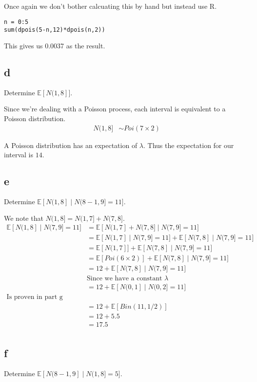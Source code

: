\documentclass{article}
\newcommand{\expect}{\mathbb{E}}
\begin{document}
Once again we don't bother calcuating this by hand but instead use R.
\begin{verbatim}
n = 0:5
sum(dpois(5-n,12)*dpois(n,2))
\end{verbatim}

This gives us 0.0037 as the result.

\subsection{d}
Determine $\expect[N(1, 8]]$.

Since we're dealing with a Poisson process, each interval is equivalent to a
Poisson distribution.
\begin{align*}
    N(1,8] &\sim Poi(7\times2)
\end{align*}

A Poisson distribution has an expectation of $\lambda$. Thus the expectation for
our interval is $14$.

\subsection{e}
Determine $\expect[N(1, 8] \;|\; N(8 - 1, 9] = 11]$.

We note that $N(1, 8] = N(1, 7] + N(7, 8]$.
\begin{align*}
    \expect[N(1, 8] \;|\; N(7, 9] = 11] 
    &= \expect[N(1, 7] + N(7, 8] \;|\; N(7, 9] = 11] \\
    &= \expect[N(1, 7] \;|\; N(7, 9] = 11]
    + \expect[N(7, 8] \;|\; N(7, 9] = 11] \\
    &= \expect[N(1, 7]]
    + \expect[N(7, 8] \;|\; N(7, 9] = 11] \\
    &= \expect[Poi(6\times2)]
    + \expect[N(7, 8] \;|\; N(7, 9] = 11] \\
    &= 12 + \expect[N(7, 8] \;|\; N(7, 9] = 11] \\
    &\text{Since we have a constant $\lambda$} \\
    &= 12 + \expect[N(0, 1] \;|\; N(0, 2] = 11] \\
    \text{Is proven in part g} \\
    &= 12 + \expect[Bin(11,1/2)] \\
    &= 12 + 5.5 \\
    &= 17.5 \\
\end{align*}

\subsection{f}
Determine $\expect[N(8 - 1, 9] \;|\; N(1, 8] = 5]$.
\end{document}
